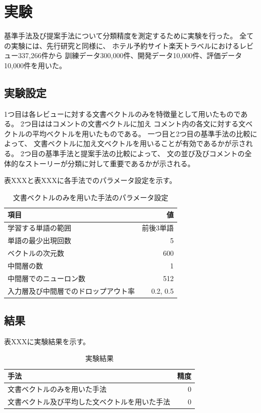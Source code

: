 \documentclass{ttithesis}
\begin{document}
\section{実験}

基準手法及び提案手法について分類精度を測定するために実験を行った。
全ての実験には、先行研究\cite{fujitani15}と同様に、
ホテル予約サイト楽天トラベルにおけるレビュー337,266件から
訓練データ300,000件、開発データ10,000件、評価データ10,000件を用いた。


\subsection{実験設定}

1つ目は各レビューに対する文書ベクトルのみを特徴量として用いたものである。
2つ目ははコメントの文書ベクトルに加え
コメント内の各文に対する文ベクトルの平均ベクトルを用いたものである。
一つ目と2つ目の基準手法の比較によって、
文書ベクトルに加え文ベクトルを用いることが有効であるかが示される。
2つ目の基準手法と提案手法の比較によって、
文の並び及びコメントの全体的なストーリーが分類に対して重要であるかが示される。

表XXXと表XXXに各手法でのパラメータ設定を示す。

\begin{table}
  \caption{文書ベクトルのみを用いた手法のパラメータ設定}
  \begin{tabular}{l | r}
    項目 & 値 \\
    \hline
    学習する単語の範囲 & 前後3単語 \\
    単語の最少出現回数 & 5 \\
    ベクトルの次元数 & 600 \\
    中間層の数 & 1 \\
    中間層でのニューロン数 & 512 \\
    入力層及び中間層でのドロップアウト率 & 0.2, 0.5 \\
  \end{tabular}
\end{table}


\subsection{結果}

表XXXに実験結果を示す。

\begin{table}
  \caption{実験結果}
  \begin{tabular}{l | r}
    手法 & 精度 \\
    \hline
    文書ベクトルのみを用いた手法 & 0 \\
    文書ベクトル及び平均した文ベクトルを用いた手法 & 0 \\
  \end{tabular}
\end{table}
\end{document}
